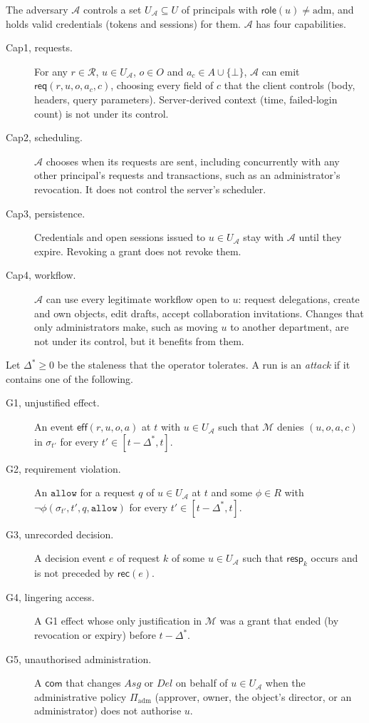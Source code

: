 \documentclass[sigconf,review,anonymous]{acmart}
\newcommand{\role}{\mathsf{role}}
\newcommand{\allowv}{\mathtt{allow}}
\newcommand{\ev}[1]{\mathsf{#1}}
\newcommand{\Routes}{\mathcal{R}}
\begin{document}
\begin{definition}[Adversary]\label{def:adv}
The adversary $\mathcal{A}$ controls a set $U_{\mathcal{A}}\subseteq U$ of principals with
$\role(u)\neq\mathrm{adm}$, and holds valid credentials (tokens and sessions) for them. $\mathcal{A}$ has four
capabilities.
\begin{description}
\item[Cap1, requests.] For any $r\in\Routes$, $u\in U_{\mathcal{A}}$, $o\in O$ and $a_c\in A\cup\{\bot\}$,
$\mathcal{A}$ can emit $\ev{req}(r,u,o,a_c,c)$, choosing every field of $c$ that the client controls (body,
headers, query parameters). Server-derived context (time, failed-login count) is not under its control.
\item[Cap2, scheduling.] $\mathcal{A}$ chooses when its requests are sent, including concurrently with any other
principal's requests and transactions, such as an administrator's revocation. It does not control the server's
scheduler.
\item[Cap3, persistence.] Credentials and open sessions issued to $u\in U_{\mathcal{A}}$ stay with $\mathcal{A}$
until they expire. Revoking a grant does not revoke them.
\item[Cap4, workflow.] $\mathcal{A}$ can use every legitimate workflow open to $u$: request delegations, create
and own objects, edit drafts, accept collaboration invitations. Changes that only administrators make, such as
moving $u$ to another department, are not under its control, but it benefits from them.
\end{description}
\end{definition}

\begin{definition}\label{def:goals}
Let $\Delta^\ast\ge0$ be the staleness that the operator tolerates. A run is an \emph{attack} if it contains
one of the following.
\begin{description}
\item[G1, unjustified effect.] An event $\ev{eff}(r,u,o,a)$ at $t$ with $u\in U_{\mathcal{A}}$ such that
$\mathcal{M}$ denies $(u,o,a,c)$ in $\sigma_{t'}$ for every $t'\in[t-\Delta^\ast,t]$.
\item[G2, requirement violation.] An $\allowv$ for a request $q$ of $u\in U_{\mathcal{A}}$ at $t$ and some
$\phi\in R$ with $\neg\phi(\sigma_{t'},t',q,\allowv)$ for every $t'\in[t-\Delta^\ast,t]$.
\item[G3, unrecorded decision.] A decision event $e$ of request $k$ of some $u\in U_{\mathcal{A}}$ such that
$\ev{resp}_k$ occurs and is not preceded by $\ev{rec}(e)$.
\item[G4, lingering access.] A G1 effect whose only justification in $\mathcal{M}$ was a grant that ended (by
revocation or expiry) before $t-\Delta^\ast$.
\item[G5, unauthorised administration.] A $\ev{com}$ that changes $\mathit{Asg}$ or $\mathit{Del}$ on behalf
of $u\in U_{\mathcal{A}}$ when the administrative policy $\Pi_{\mathrm{adm}}$ (approver, owner, the object's
director, or an administrator) does not authorise $u$.
\end{description}
\end{definition}
\end{document}

